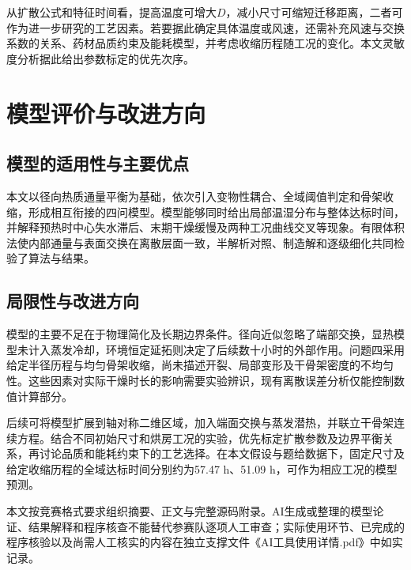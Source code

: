 从扩散公式和特征时间看，提高温度可增大$D$，减小尺寸可缩短迁移距离，二者可作为进一步研究的工艺因素。若要据此确定具体温度或风速，还需补充风速与交换系数的关系、药材品质约束及能耗模型，并考虑收缩历程随工况的变化。本文灵敏度分析据此给出参数标定的优先次序。
\FloatBarrier

\section{模型评价与改进方向}
\subsection{模型的适用性与主要优点}
本文以径向热质通量平衡为基础，依次引入变物性耦合、全域阈值判定和骨架收缩，形成相互衔接的四问模型。模型能够同时给出局部温湿分布与整体达标时间，并解释预热时中心失水滞后、末期干燥缓慢及两种工况曲线交叉等现象。有限体积法使内部通量与表面交换在离散层面一致，半解析对照、制造解和逐级细化共同检验了算法与结果。

\subsection{局限性与改进方向}
模型的主要不足在于物理简化及长期边界条件。径向近似忽略了端部交换，显热模型未计入蒸发冷却，环境恒定延拓则决定了后续数十小时的外部作用。问题四采用给定半径历程与均匀骨架收缩，尚未描述开裂、局部变形及干骨架密度的不均匀性。这些因素对实际干燥时长的影响需要实验辨识，现有离散误差分析仅能控制数值计算部分。

后续可将模型扩展到轴对称二维区域，加入端面交换与蒸发潜热，并联立干骨架连续方程。结合不同初始尺寸和烘房工况的实验，优先标定扩散参数及边界平衡关系，再讨论品质和能耗约束下的工艺选择。在本文假设与题给数据下，固定尺寸及给定收缩历程的全域达标时间分别约为57.47 h、51.09 h，可作为相应工况的模型预测。

本文按竞赛格式要求组织摘要、正文与完整源码附录\cite{format}。AI生成或整理的模型论证、结果解释和程序核查不能替代参赛队逐项人工审查；实际使用环节、已完成的程序核验以及尚需人工核实的内容在独立支撑文件《AI工具使用详情.pdf》中如实记录\cite{airule}。

